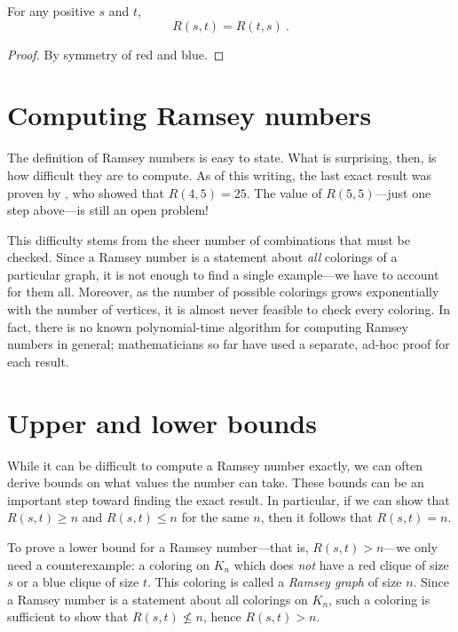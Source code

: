 \documentclass{article}
\begin{document}
\begin{Proposition}
    For any positive $s$ and $t$,
    \[ R(s,t) = R(t,s) \ . \]
\end{Proposition}

\begin{proof}
    By symmetry of red and blue.
\end{proof}

\section{Computing Ramsey numbers}

The definition of Ramsey numbers is easy to state. What is surprising, then, is how difficult they are to compute. As of this writing, the last exact result was proven by \cite{JGT:JGT3190190304}, who showed that $R(4,5) = 25$. The value of $R(5,5)$---just one step above---is still an open problem!


This difficulty stems from the sheer number of combinations that must be checked. Since a Ramsey number is a statement about \emph{all} colorings of a particular graph, it is not enough to find a single example---we have to account for them all. Moreover, as the number of possible colorings grows exponentially with the number of vertices, it is almost never feasible to check every coloring. In fact, there is no known polynomial-time algorithm for computing Ramsey numbers in general; mathematicians so far have used a separate, ad-hoc proof for each result.

\section{Upper and lower bounds}

While it can be difficult to compute a Ramsey number exactly, we can often derive bounds on what values the number can take. These bounds can be an important step toward finding the exact result. In particular, if we can show that $R(s,t) \geq n$ and $R(s,t) \leq n$ for the same $n$, then it follows that $R(s,t) = n$.

To prove a lower bound for a Ramsey number---that is, $R(s,t) > n$---we only need a counterexample: a coloring on $K_n$ which does \emph{not} have a red clique of size $s$ or a blue clique of size $t$. This coloring is called a \textit{Ramsey graph} of size $n$. Since a Ramsey number is a statement about all colorings on $K_n$, such a coloring is sufficient to show that $R(s,t) \nleq n$, hence $R(s,t) > n$.
\end{document}
